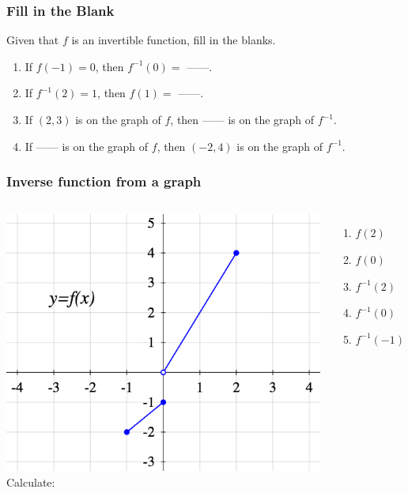\documentclass[14pt]{beamer}
\begin{document}
	\begin{frame}
		\frametitle{Fill in the Blank }

		Given that $f$ is an invertible function, fill in the blanks.
		\begin{enumerate}
			\item If $f(-1) = 0$, then $f^{-1}(0) =$ ------.

			\item If $f^{-1}(2) = 1$, then $f(1)=$ ------.

			\item If $(2,3)$ is on the graph of $f$, then ------ is on the graph of $f^{-1}$.

			\item If ------ is on the graph of $f$, then $(-2,4)$ is on the graph of $f
				^{-1}$.
		\end{enumerate}
	\end{frame}


	\begin{frame}
		\frametitle{Inverse function from a graph}

		\begin{columns}[c]
			\includegraphics[scale=.4]{G12}
			Calculate:
			\begin{enumerate}
				\item $\displaystyle f(2)$

				\item $\displaystyle f(0)$

				\item $\displaystyle f^{-1}(2)$

				\item $\displaystyle f^{-1}(0)$

				\item $\displaystyle f^{-1}(-1)$
			\end{enumerate}
		\end{columns}
	\end{frame}
\end{document}
